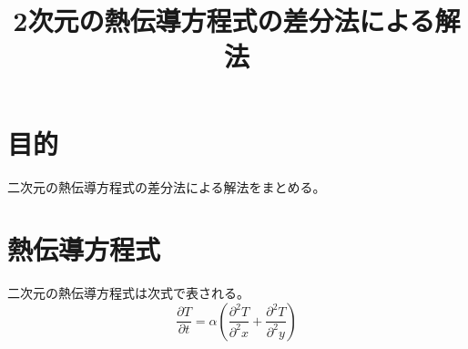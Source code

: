 \documentclass{ujarticle}
\title{2次元の熱伝導方程式の差分法による解法}
\begin{document}
\maketitle
\section{目的}
二次元の熱伝導方程式の差分法による解法をまとめる。
\section{熱伝導方程式}
二次元の熱伝導方程式は次式で表される。
\begin{equation}
\frac{\partial T}{\partial t} = \alpha \left(\frac{\partial^2T}{\partial^2x} + \frac{\partial^2T}{\partial^2y}\right)
\end{equation}
\begin{equation}

\end{equation}
\end{document}
